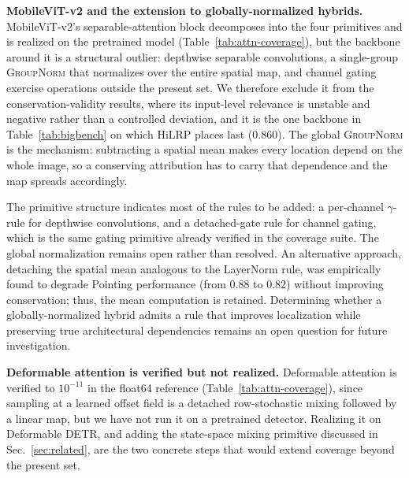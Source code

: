 \documentclass[lettersize,journal]{IEEEtran}
\theoremstyle{definition}
\theoremstyle{plain}
\begin{document}
\textbf{MobileViT-v2 and the extension to globally-normalized hybrids.} MobileViT-v2's separable-attention block decomposes into the four primitives and is realized on the pretrained model (Table~\ref{tab:attn-coverage}), but the backbone around it is a structural outlier: depthwise separable convolutions, a single-group \textsc{GroupNorm} that normalizes over the entire spatial map, and channel gating exercise operations outside the present set. We therefore exclude it from the conservation-validity results, where its input-level relevance is unstable and negative rather than a controlled deviation, and it is the one backbone in Table~\ref{tab:bigbench} on which HiLRP places last ($0.860$). The global \textsc{GroupNorm} is the mechanism: subtracting a spatial mean makes every location depend on the whole image, so a conserving attribution has to carry that dependence and the map spreads accordingly.

The primitive structure indicates most of the rules to be added: a per-channel $\gamma$-rule for depthwise convolutions, and a detached-gate rule for channel gating, which is the same gating primitive already verified in the coverage suite. The global normalization remains open rather than resolved. An alternative approach, detaching the spatial mean analogous to the LayerNorm rule, was empirically found to degrade Pointing performance (from $0.88$ to $0.82$) without improving conservation; thus, the mean computation is retained. Determining whether a globally-normalized hybrid admits a rule that improves localization while preserving true architectural dependencies remains an open question for future investigation.

\textbf{Deformable attention is verified but not realized.} Deformable attention is verified to $10^{-11}$ in the float64 reference (Table~\ref{tab:attn-coverage}), since sampling at a learned offset field is a detached row-stochastic mixing followed by a linear map, but we have not run it on a pretrained detector. Realizing it on Deformable DETR, and adding the state-space mixing primitive discussed in Sec.~\ref{sec:related}, are the two concrete steps that would extend coverage beyond the present set.
\end{document}

